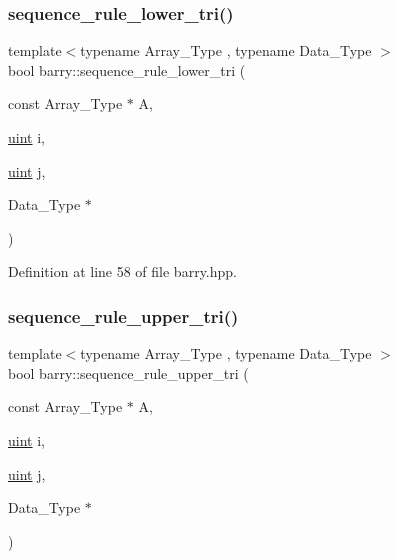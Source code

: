 \subsubsection{\texorpdfstring{sequence\+\_\+rule\+\_\+lower\+\_\+tri()}{sequence\_rule\_lower\_tri()}}
{\footnotesize\ttfamily template$<$typename Array\+\_\+\+Type , typename Data\+\_\+\+Type $>$ \\
bool barry\+::sequence\+\_\+rule\+\_\+lower\+\_\+tri (\begin{DoxyParamCaption}\item[{const Array\+\_\+\+Type $\ast$}]{A,  }\item[{\hyperlink{namespacebarry_a11dfc53ddb4672278319aa04f1e09a6c}{uint}}]{i,  }\item[{\hyperlink{namespacebarry_a11dfc53ddb4672278319aa04f1e09a6c}{uint}}]{j,  }\item[{Data\+\_\+\+Type $\ast$}]{ }\end{DoxyParamCaption})\hspace{0.3cm}{\ttfamily [inline]}}



Definition at line 58 of file barry.\+hpp.

\mbox{\label{namespacebarry_a1433970b34e5904f846a0aa41abef448}} 
\subsubsection{\texorpdfstring{sequence\+\_\+rule\+\_\+upper\+\_\+tri()}{sequence\_rule\_upper\_tri()}}
{\footnotesize\ttfamily template$<$typename Array\+\_\+\+Type , typename Data\+\_\+\+Type $>$ \\
bool barry\+::sequence\+\_\+rule\+\_\+upper\+\_\+tri (\begin{DoxyParamCaption}\item[{const Array\+\_\+\+Type $\ast$}]{A,  }\item[{\hyperlink{namespacebarry_a11dfc53ddb4672278319aa04f1e09a6c}{uint}}]{i,  }\item[{\hyperlink{namespacebarry_a11dfc53ddb4672278319aa04f1e09a6c}{uint}}]{j,  }\item[{Data\+\_\+\+Type $\ast$}]{ }\end{DoxyParamCaption})\hspace{0.3cm}{\ttfamily [inline]}}



